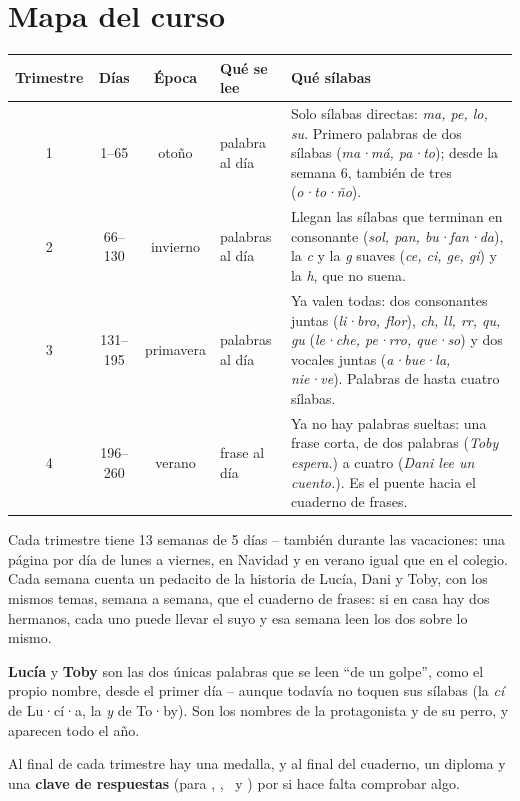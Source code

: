 \section*{Mapa del curso}

\begin{center}
\renewcommand{\arraystretch}{1.4}
\begin{tabularx}{\linewidth}{@{}c c c >{\raggedright\arraybackslash}p{27mm} >{\raggedright\arraybackslash}X@{}}
\toprule
\textbf{Trimestre} & \textbf{Días} & \textbf{Época} & \textbf{Qué se lee} & \textbf{Qué sílabas} \\
\midrule
1 & 1--65    & otoño     & 1 palabra al día  & Solo sílabas directas: \emph{ma, pe, lo, su}. Primero palabras de
dos sílabas (\emph{ma·má, pa·to}); desde la semana 6, también de tres
(\emph{o·to·ño}). \\
2 & 66--130  & invierno  & 2 palabras al día & Llegan las sílabas que terminan en consonante (\emph{sol, pan,
bu·fan·da}), la \emph{c} y la \emph{g} suaves (\emph{ce, ci, ge, gi}) y la
\emph{h}, que no suena. \\
3 & 131--195 & primavera & 3 palabras al día & Ya valen todas: dos consonantes juntas (\emph{li·bro, flor}),
\emph{ch, ll, rr, qu, gu} (\emph{le·che, pe·rro, que·so}) y dos vocales
juntas (\emph{a·bue·la, nie·ve}). Palabras de hasta cuatro sílabas. \\
4 & 196--260 & verano    & 1 frase al día    & Ya no hay palabras sueltas: una frase corta, de dos palabras
(\emph{Toby espera.}) a cuatro (\emph{Dani lee un cuento.}). Es el
puente hacia el cuaderno de frases. \\
\bottomrule
\end{tabularx}
\end{center}

\vspace{6mm}
Cada trimestre tiene 13 semanas de 5 días -- también durante las
vacaciones: una página por día de lunes a viernes, en Navidad y en
verano igual que en el colegio. Cada semana cuenta un pedacito de la
historia de Lucía, Dani y Toby, con los mismos temas, semana a semana,
que el cuaderno de frases: si en casa hay dos hermanos, cada uno puede
llevar el suyo y esa semana leen los dos sobre lo mismo.

\vspace{4mm}
\textbf{Lucía} y \textbf{Toby} son las dos únicas palabras que se leen
``de un golpe'', como el propio nombre, desde el primer día -- aunque
todavía no toquen sus sílabas (la \emph{cí} de Lu·cí·a, la \emph{y} de
To·by). Son los nombres de la protagonista y de su perro, y aparecen
todo el año.

\vspace{4mm}
Al final de cada trimestre hay una medalla, y al final del cuaderno,
un diploma y una \textbf{clave de respuestas} (para \lblAdivina,
\lblUne, \lblEncuentra\ y \lblSiNo) por si hace falta comprobar algo.
\newpage
